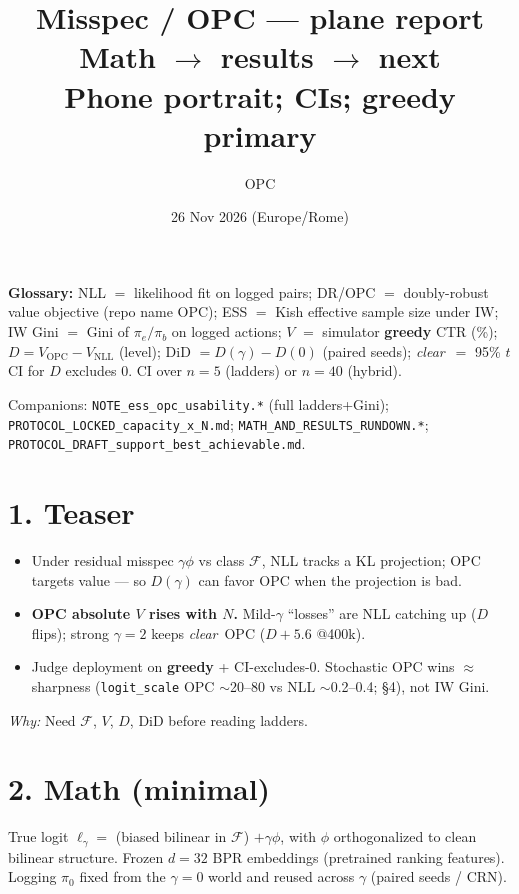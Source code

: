 \documentclass[11pt]{article}
\title{\textbf{Misspec / OPC --- plane report}\\[0.15em]
\large Math $\to$ results $\to$ next\\[0.1em]
\normalsize Phone portrait; CIs; greedy primary}
\author{OPC}
\date{26 Nov 2026 (Europe/Rome)}
\newcommand{\phonesection}[1]{\Needspace{7\baselineskip}\section*{#1}}
\newcommand{\why}[1]{\par{\footnotesize\color{blue!35!black}\textit{Why:} #1\par}}
\newcommand{\clearwin}{\emph{clear}}
\begin{document}
\maketitle

{\footnotesize\raggedright
\textbf{Glossary:}
NLL $=$ likelihood fit on logged pairs;
DR/OPC $=$ doubly-robust value objective
(repo name OPC);
ESS $=$ Kish effective sample size under IW;
IW Gini $=$ Gini of \(\pi_e/\pi_b\) on logged
actions;
\(V\) $=$ simulator \textbf{greedy} CTR (\%);
\(D=V_{\mathrm{OPC}}-V_{\mathrm{NLL}}\) (level);
DiD \(=D(\gamma)-D(0)\) (paired seeds);
\clearwin\ $=$ 95\% \(t\) CI for \(D\) excludes 0.
CI over \(n{=}5\) (ladders) or \(n{=}40\) (hybrid).
\par
{\footnotesize Companions:
\texttt{NOTE\_ess\_opc\_usability.*} (full ladders+Gini);
\texttt{PROTOCOL\_LOCKED\_capacity\_x\_N.md};
\texttt{MATH\_AND\_RESULTS\_RUNDOWN.*};
\texttt{PROTOCOL\_DRAFT\_support\_best\_achievable.md}.\par}
}

\phonesection{1. Teaser}

\begin{itemize}
  \item Under residual misspec \(\gamma\phi\) vs
        class \(\mathcal{F}\), NLL tracks a KL
        projection; OPC targets value --- so
        \(D(\gamma)\) can favor OPC when the
        projection is bad.
  \item \textbf{OPC absolute \(V\) rises with \(N\).}
        Mild-\(\gamma\) ``losses'' are NLL catching
        up (\(D\) flips); strong \(\gamma{=}2\) keeps
        \clearwin\ OPC (\(D{+}5.6\) @400k).
  \item Judge deployment on \textbf{greedy} +
        CI-excludes-0. Stochastic OPC wins
        \(\approx\) sharpness
        (\texttt{logit\_scale} OPC \(\sim\)20--80 vs
        NLL \(\sim\)0.2--0.4; §4), not IW Gini.
\end{itemize}

\why{Need \(\mathcal{F}\), \(V\), \(D\), DiD
before reading ladders.}

\phonesection{2. Math (minimal)}

True logit
\(\ell_\gamma =\) (biased bilinear in
\(\mathcal{F}\)) \(+\gamma\phi\), with \(\phi\)
orthogonalized to clean bilinear structure.
Frozen \(d{=}32\) BPR embeddings (pretrained
ranking features). Logging \(\pi_0\) fixed from
the \(\gamma{=}0\) world and reused across \(\gamma\)
(paired seeds / CRN).
\end{document}

